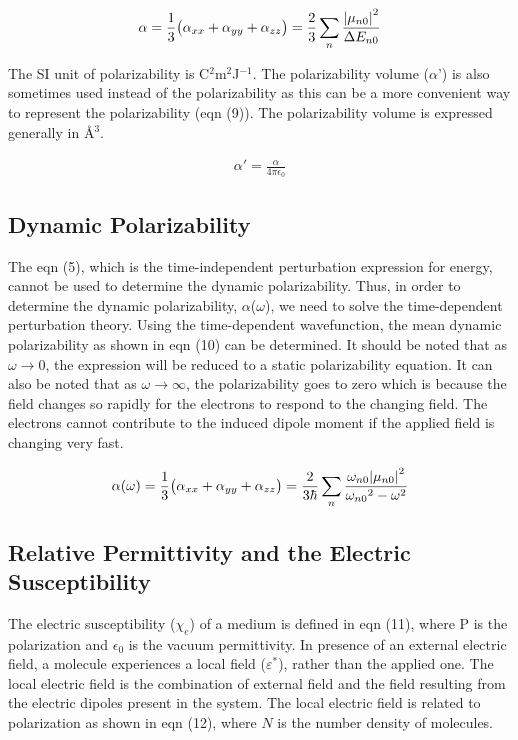 \begin{align}
\alpha =\frac{1}{3}\big(\alpha_{xx}+\alpha_{yy}+\alpha_{zz}\big)=\frac{2}{3}\sum_n  \frac{\abs{\mu_{n0}}^2}{ \Delta E_{n0} }
\end{align}

The SI unit of polarizability is C$^2$m$^2$J$^{-1}$. The polarizability volume ($\alpha$') is also sometimes used instead of the polarizability as this can be a more convenient way to represent the polarizability (eqn (9)). The polarizability volume is expressed generally in \AA$^3$.

\begin{align}
\alpha' =\frac{\alpha}{4\pi\epsilon_0}
\end{align}


\subsection{Dynamic Polarizability} 

The eqn (5), which is the time-independent perturbation expression for energy, cannot be used to determine the dynamic polarizability. Thus, in order to determine the dynamic polarizability, $\alpha$($\omega$), we need to solve the time-dependent perturbation theory. Using the time-dependent wavefunction, the mean dynamic polarizability as shown in eqn (10) can be determined. It should be noted that as $\omega\rightarrow $0, the expression will be reduced to a static polarizability equation. It can also be noted that as $\omega\rightarrow \infty$, the polarizability goes to zero which is because the field changes so rapidly for the electrons to respond to the changing field. The electrons cannot contribute to the induced dipole moment if the applied field is changing very fast. 

\begin{align}
\alpha(\omega) =\frac{1}{3}\big(\alpha_{xx}+\alpha_{yy}+\alpha_{zz}\big) =\frac{2}{3\hbar}\sum_n  \frac{\omega_{n0}\abs{\mu_{n0}}^2}{ {\omega_{n0}}^2 - \omega^2}
\end{align}

\subsection{Relative Permittivity and the Electric Susceptibility}

The electric susceptibility ($\chi_e$) of a medium is defined in eqn (11), where P is the polarization and $\epsilon_0$ is the vacuum permittivity. In presence of an external electric field, a molecule experiences a local field ($\varepsilon^*$), rather than the applied one. The local electric field is the combination of external field and the field resulting from the electric dipoles present in the system. The local electric field is related to polarization as shown in eqn (12), where $N$ is the number density of molecules. 

